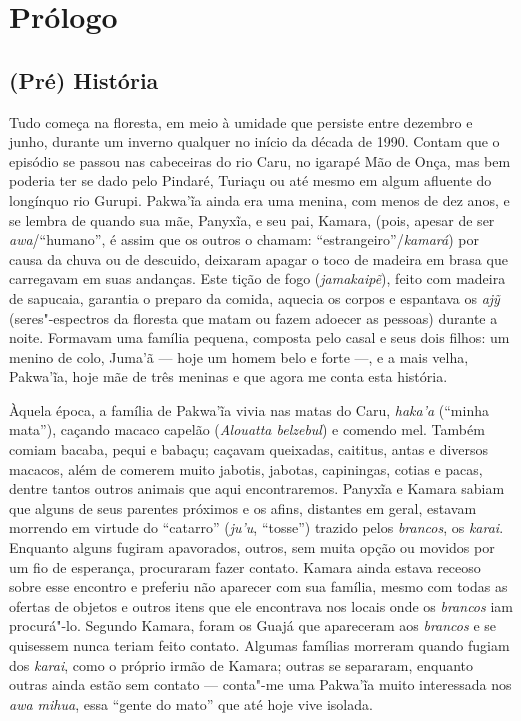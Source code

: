\chapter{Prólogo}\label{pruxf3logo}


\section{(Pré) História}\label{pruxe9-histuxf3ria}

Tudo começa na floresta, em meio à umidade que persiste entre dezembro e
junho, durante um inverno qualquer no início da década de 1990. Contam
que o episódio se passou nas cabeceiras do rio Caru, no igarapé
Mão de Onça, mas bem poderia ter se dado pelo Pindaré, Turiaçu ou até
mesmo em algum afluente do longínquo rio Gurupi. Pakwa'ĩa ainda era uma
menina, com menos de dez anos, e se lembra de quando sua mãe, Panyxĩa, e
seu pai, Kamara, (pois, apesar de ser \emph{awa}/``humano'', é assim que
os outros o chamam: ``estrangeiro''/\emph{kamará}) por causa da chuva ou
de descuido, deixaram apagar o toco de madeira em brasa que carregavam
em suas andanças. Este tição de fogo (\emph{jamakaipẽ}), feito com
madeira de sapucaia, garantia o preparo da comida, aquecia os corpos e
espantava os \emph{ajỹ} (seres"-espectros da floresta que matam ou fazem
adoecer as pessoas) durante a noite. Formavam uma família pequena,
composta pelo casal e seus dois filhos: um menino de colo, Juma'ã --- hoje
um homem belo e forte ---, e a mais velha, Pakwa'ĩa, hoje mãe de três
meninas e que agora me conta esta história.

Àquela época, a família de Pakwa'ĩa vivia nas matas do Caru,
\emph{haka'a} (``minha mata''), caçando macaco capelão (\emph{Alouatta
belzebul}) e comendo mel. Também comiam bacaba, pequi e babaçu; caçavam
queixadas, caititus, antas e diversos macacos, além de comerem muito
jabotis, jabotas, capiningas, cotias e pacas, dentre tantos outros
animais que aqui encontraremos. Panyxĩa e Kamara sabiam que alguns de
seus parentes próximos e os afins, distantes em geral, estavam morrendo
em virtude do ``catarro'' (\emph{ju'u}, ``tosse'') trazido pelos
\emph{brancos}, os \emph{karai}. Enquanto alguns fugiram apavorados,
outros, sem muita opção ou movidos por um fio de esperança, procuraram
fazer contato. Kamara ainda estava receoso sobre esse encontro e
preferiu não aparecer com sua família, mesmo com todas as ofertas de
objetos e outros itens que ele encontrava nos locais onde os
\emph{brancos} iam procurá"-lo. Segundo Kamara, foram os Guajá que
apareceram aos \emph{brancos} e se quisessem nunca teriam feito contato. Algumas famílias morreram quando fugiam dos \emph{karai}, como
o próprio irmão de Kamara; outras se separaram, enquanto outras ainda
estão sem contato --- conta"-me uma Pakwa'ĩa muito interessada nos
\emph{awa mihua}, essa ``gente do mato'' que até hoje vive isolada.


